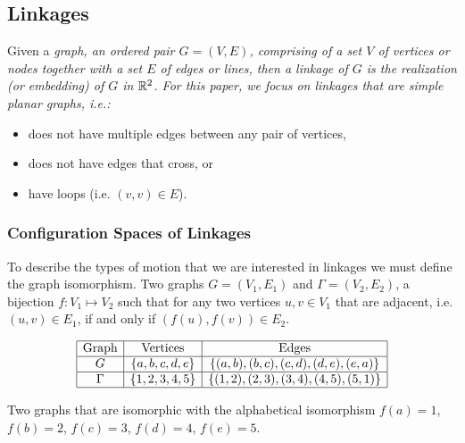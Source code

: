 \subsection{Linkages}
Given a \it{graph}, an ordered pair $G = (V,E)$, comprising of a set $V$ of vertices or nodes together with a set $E$ of edges or lines, then a linkage of $G$ is the realization (or embedding) of $G$ in ${\mathbb{R}}^2$. For this paper, we focus on linkages that are simple planar  graphs, i.e.:
\begin{itemize}
\item[\rn{1}] does not have multiple edges between any pair of vertices,
\item[\rn{2}] does not have edges that cross, or
\item[\rn{3}] have loops (i.e. $(v,v) \in E$).
\end{itemize}
\subsubsection{Configuration Spaces of Linkages}
To describe the types of motion that we are interested in linkages we must define the graph isomorphism.  Two graphs $G=(V_1,E_1)$ and $\Gamma = (V_2,E_2) $, a bijection $f: V_1 \mapsto V_2$ such that for any two vertices $u,v \in V_1$ that are adjacent, i.e. $(u, v) \in E_1$, if and only if $(f(u),f(v)) \in E_2$. 
\begin{table}[!ht]
\begin{center}
$$\begin{array}{|c|c|c|}\hline
\text{Graph}&\text{Vertices}&\text{Edges}\\\hline
G&\left\lbrace a,b,c,d,e \right\rbrace & \left\lbrace (a,b),(b,c),(c,d),(d,e),(e,a) \right\rbrace \\\hline
\Gamma&\left\lbrace 1,2,3,4,5 \right\rbrace & \left\lbrace (1,2),(2,3),(3,4),(4,5),(5,1) \right\rbrace \\\hline
\end{array} $$
\caption{Two graphs that are isomorphic with the alphabetical isomorphism $f(a)=1$, $f(b)=2$, $f(c) = 3$, $f(d)=4$, $f(e)=5$.}
\end{center} 
\end{table} 

